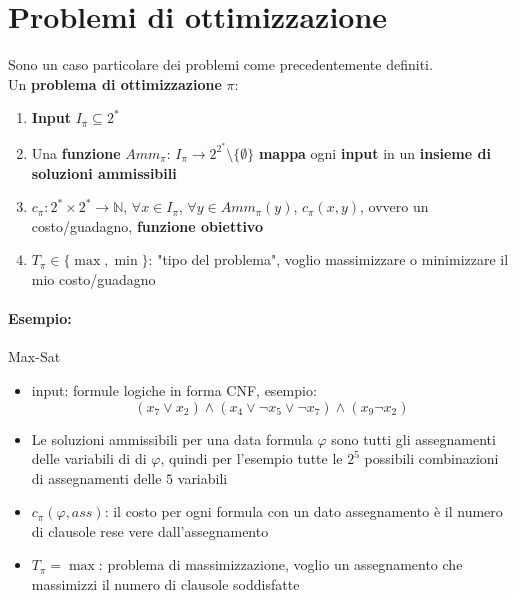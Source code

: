 
\section{Problemi di ottimizzazione}

Sono un caso particolare dei problemi come precedentemente definiti.\\

Un \textbf{problema di ottimizzazione} $\pi$: 
\begin{enumerate}
	\item \textbf{Input} $I_\pi \subseteq 2^\ast$
	
	\item Una \textbf{funzione} $Amm_\pi: \, I_\pi \rightarrow 2^{2^\ast} \setminus \{\emptyset\}$ \textbf{mappa} ogni \textbf{input} in un \textbf{insieme di soluzioni ammissibili}
	
	\item $c_\pi: 2^\ast \times 2^\ast \rightarrow \mathbb{N}$, $\forall x \in I_\pi$, $\forall y \in Amm_\pi (y)$, $c_\pi (x,y)$, ovvero un costo/guadagno, \textbf{funzione obiettivo}
	
	\item $T_\pi \in \{\max, \min\}$: "tipo del problema", voglio massimizzare o minimizzare il mio costo/guadagno
\end{enumerate}

\paragraph{Esempio:} Max-Sat
\begin{itemize}
	\item input: formule logiche in forma CNF, esempio:
	$$ (x_7 \vee x_2) \wedge (x_4 \vee \neg x_5 \vee \neg x_7) \wedge (x_9 \neg x_2) $$
	
	\item Le soluzioni ammissibili per una data formula $\varphi$ sono tutti gli assegnamenti delle variabili di di $\varphi$, quindi per l'esempio tutte le $2^5$ possibili combinazioni di assegnamenti delle $5$ variabili
	
	\item $c_\pi (\varphi, ass)$: il costo per ogni formula con un dato assegnamento è il numero di clausole rese vere dall'assegnamento
	
	\item $T_\pi = \max$: problema di massimizzazione, voglio un assegnamento che massimizzi il numero di clausole soddisfatte
\end{itemize}

